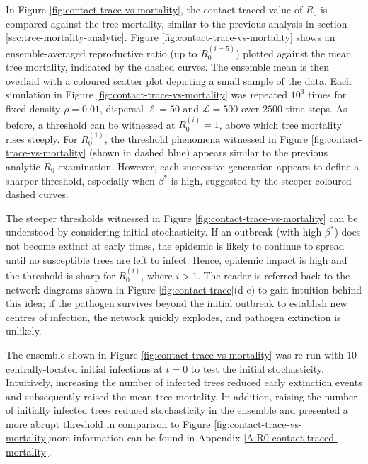 In Figure \ref{fig:contact-trace-vs-mortality}, the contact-traced value of $R_0$ is compared against the tree mortality, similar to the previous analysis in section \ref{sec:tree-mortality-analytic}.
Figure \ref{fig:contact-trace-vs-mortality} shows an ensemble-averaged reproductive ratio (up to $R_0^{(i=5)}$) plotted against the mean tree mortality, indicated by the dashed curves.
The ensemble mean is then overlaid with a coloured scatter plot depicting a small sample of the data.
Each simulation in Figure \ref{fig:contact-trace-vs-mortality} was repeated $10^3$ times for fixed density $\rho=0.01$, dispersal $\ell=50$ and $\mathcal{L}=500$ over $2500$ time-steps.
As before, a threshold can be witnessed at $R_0^{(i)}=1$, above which tree mortality rises steeply.
For $R_0^{(1)}$, the threshold phenomena witnessed in Figure \ref{fig:contact-trace-vs-mortality} (shown in dashed blue) appears similar to the previous analytic $R_0$ examination.
However, each successive generation appears to define a sharper threshold, especially when $\beta^*$ is high, suggested by the steeper coloured dashed curves.

The steeper thresholds witnessed in Figure \ref{fig:contact-trace-vs-mortality} can be understood
by considering initial stochasticity.
If an outbreak (with high $\beta^*$) does not become extinct at early times, the epidemic is likely to continue to spread until no susceptible trees are left to infect.
Hence, epidemic impact is high and the threshold is sharp for $R_0^{(i)}$, where $i > 1$. 
The reader is referred back to the network diagrams shown in Figure \ref{fig:contact-trace}(d-e) to gain intuition behind this idea;
if the pathogen survives beyond the initial outbreak to establish new centres of infection, the network quickly explodes, and pathogen extinction is unlikely.

The ensemble shown in Figure \ref{fig:contact-trace-vs-mortality} was re-run with $10$ centrally-located initial infections at $t=0$ to test the initial stochasticity.
Intuitively, increasing the number of infected trees reduced early extinction events and subsequently raised the mean tree mortality.
In addition, raising the number of initially infected trees reduced stochasticity in the ensemble and presented a more abrupt threshold in comparison to Figure \ref{fig:contact-trace-vs-mortality}\textemdash more information can be found in Appendix \ref{A:R0-contact-traced-mortality}.

